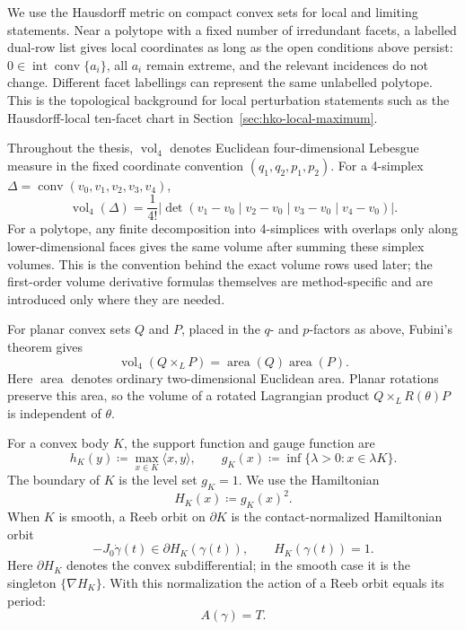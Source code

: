 We use the Hausdorff metric on compact convex sets for local and limiting
statements. Near a polytope with a fixed number of irredundant facets, a
labelled dual-row list gives local coordinates as long as the open conditions
above persist: \(0\in\operatorname{int}\operatorname{conv}\{a_i\}\), all
\(a_i\) remain extreme, and the relevant incidences do not change. Different
facet labellings can represent the same unlabelled polytope. This is the
topological background for local perturbation statements such as the
Hausdorff-local ten-facet chart in
Section~\ref{sec:hko-local-maximum}.

Throughout the thesis,
\(\operatorname{vol}_4\) denotes Euclidean four-dimensional Lebesgue measure in
the fixed coordinate convention \((q_1,q_2,p_1,p_2)\). For a 4-simplex
\(\Delta=\operatorname{conv}(v_0,v_1,v_2,v_3,v_4)\),
\[
  \operatorname{vol}_4(\Delta)
  =
  \frac{1}{4!}
  \left|
    \det(v_1-v_0\mid v_2-v_0\mid v_3-v_0\mid v_4-v_0)
  \right|.
\]
For a polytope, any finite decomposition into 4-simplices with overlaps only
along lower-dimensional faces gives the same volume after summing these simplex
volumes. This is the convention behind the exact volume rows used later; the
first-order volume derivative formulas themselves are method-specific and are
introduced only where they are needed.

For planar convex sets \(Q\) and \(P\), placed in the \(q\)- and \(p\)-factors
as above, Fubini's theorem gives
\[
  \operatorname{vol}_4(Q\times_L P)
  =
  \operatorname{area}(Q)\operatorname{area}(P).
\]
Here \(\operatorname{area}\) denotes ordinary two-dimensional Euclidean area.
Planar rotations preserve this area, so the volume of a rotated Lagrangian
product \(Q\times_L R(\theta)P\) is independent of \(\theta\).

For a convex body \(K\), the support function and gauge function are
\[
  h_K(y) \coloneqq \max_{x\in K}\langle x,y\rangle,
  \qquad
  g_K(x) \coloneqq \inf\{\lambda>0:x\in \lambda K\}.
\]
The boundary of \(K\) is the level set \(g_K=1\). We use the Hamiltonian
\[
  H_K(x) \coloneqq g_K(x)^2.
\]
When \(K\) is smooth, a Reeb orbit on \(\partial K\) is the contact-normalized
Hamiltonian orbit
\begin{equation}\label{eq:preliminaries-smooth-reeb-inclusion}
  -J_0\dot{\gamma}(t) \in \partial H_K(\gamma(t)),
  \qquad
  H_K(\gamma(t))=1.
\end{equation}
Here \(\partial H_K\) denotes the convex subdifferential; in the smooth case it
is the singleton \(\{\nabla H_K\}\). With this normalization the action of a
Reeb orbit equals its period:
\[
  A(\gamma)=T.
\]
